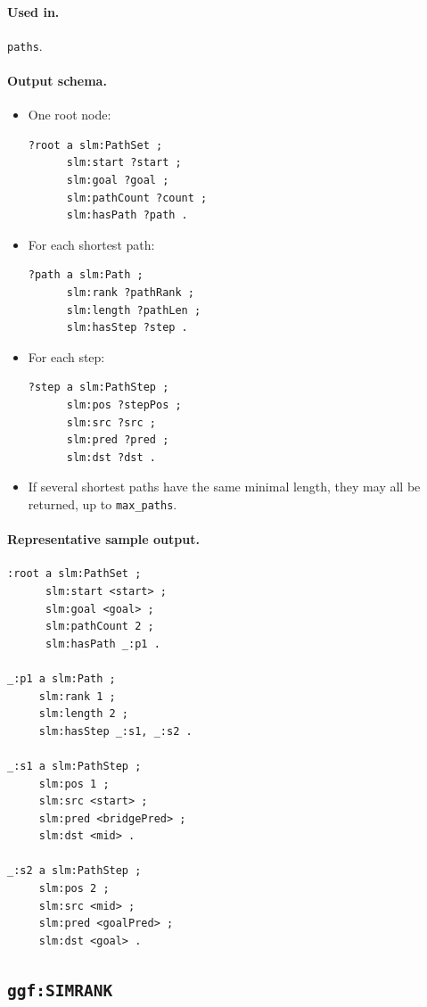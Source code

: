 \paragraph{Used in.}
\texttt{paths}.

\paragraph{Output schema.}
\begin{itemize}
\item One root node:
\begin{verbatim}
?root a slm:PathSet ;
      slm:start ?start ;
      slm:goal ?goal ;
      slm:pathCount ?count ;
      slm:hasPath ?path .
\end{verbatim}
\item For each shortest path:
\begin{verbatim}
?path a slm:Path ;
      slm:rank ?pathRank ;
      slm:length ?pathLen ;
      slm:hasStep ?step .
\end{verbatim}
\item For each step:
\begin{verbatim}
?step a slm:PathStep ;
      slm:pos ?stepPos ;
      slm:src ?src ;
      slm:pred ?pred ;
      slm:dst ?dst .
\end{verbatim}
\item If several shortest paths have the same minimal length, they may all be
returned, up to \texttt{max\_paths}.
\end{itemize}

\paragraph{Representative sample output.}
\begin{verbatim}
:root a slm:PathSet ;
      slm:start <start> ;
      slm:goal <goal> ;
      slm:pathCount 2 ;
      slm:hasPath _:p1 .

_:p1 a slm:Path ;
     slm:rank 1 ;
     slm:length 2 ;
     slm:hasStep _:s1, _:s2 .

_:s1 a slm:PathStep ;
     slm:pos 1 ;
     slm:src <start> ;
     slm:pred <bridgePred> ;
     slm:dst <mid> .

_:s2 a slm:PathStep ;
     slm:pos 2 ;
     slm:src <mid> ;
     slm:pred <goalPred> ;
     slm:dst <goal> .
\end{verbatim}

\subsection{\texttt{ggf:SIMRANK}}
\label{subsec:ggf-simrank}


